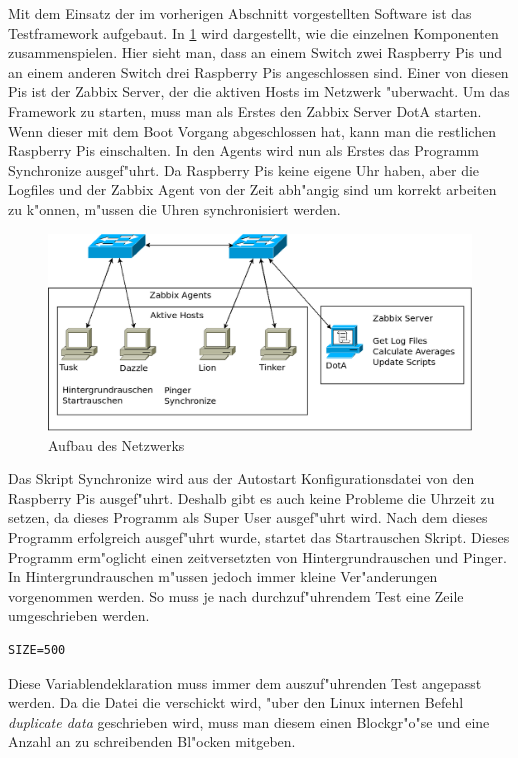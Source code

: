 Mit dem Einsatz der im vorherigen Abschnitt vorgestellten Software ist das Testframework aufgebaut. In \cref{fig:AufbauVomNetzwerk} %
wird dargestellt, wie die einzelnen Komponenten zusammenspielen. Hier sieht man, dass an einem Switch zwei Raspberry Pis %
und an einem anderen Switch drei Raspberry Pis angeschlossen sind. Einer von diesen Pis ist der Zabbix Server, der %
die aktiven Hosts im Netzwerk "uberwacht. Um das Framework zu starten, muss man als Erstes den Zabbix Server DotA starten. %
Wenn dieser mit dem Boot Vorgang abgeschlossen hat, kann man die restlichen Raspberry Pis einschalten. %
In den Agents wird nun als Erstes das Programm Synchronize ausgef"uhrt. Da Raspberry Pis keine eigene Uhr haben, aber %
die Logfiles und der Zabbix Agent von der Zeit abh"angig sind um korrekt arbeiten zu k"onnen, m"ussen die Uhren synchronisiert werden. %
\label{sec:einsatzImNetzwerk}%
\begin{figure}[htbp]%
\centering%
\includegraphics*[width=0.9\linewidth]{Abb/Netzschaltung3}%
%
\caption{Aufbau des Netzwerks}%
\label{fig:AufbauVomNetzwerk}%
\end{figure}%
Das Skript Synchronize wird aus der Autostart Konfigurationsdatei von den Raspberry Pis ausgef"uhrt. Deshalb gibt es auch keine %
Probleme die Uhrzeit zu setzen, da dieses Programm als Super User ausgef"uhrt wird. %
Nach dem dieses Programm erfolgreich ausgef"uhrt wurde, startet das Startrauschen Skript. %
Dieses Programm erm"oglicht einen zeitversetzten von Hintergrundrauschen und Pinger. %
In Hintergrundrauschen m"ussen jedoch immer kleine Ver"anderungen vorgenommen werden. %
So muss je nach durchzuf"uhrendem Test eine Zeile umgeschrieben werden. %
\begin{verbatim}
SIZE=500
\end{verbatim}
Diese Variablendeklaration muss immer dem auszuf"uhrenden Test angepasst werden. %
Da die Datei die verschickt wird, "uber den Linux internen Befehl \emph{duplicate data} geschrieben %
wird, muss man diesem einen Blockgr"o"se und eine Anzahl an zu schreibenden Bl"ocken mitgeben. %
